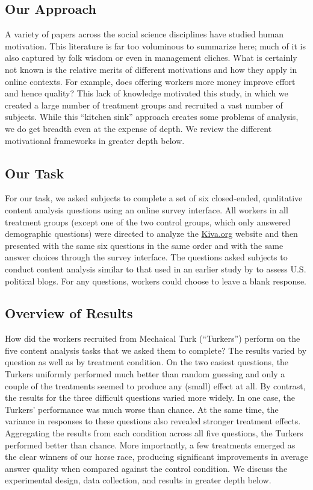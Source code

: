 \documentclass{chi2009}
\begin{document}
{\subsection{Our Approach} 
A variety of papers across the social science disciplines have studied
human motivation. This literature is far too voluminous to summarize
here; much of it is also captured by folk wisdom or even in management
cliches. What is certainly not known is the relative merits of
different motivations and how they apply in online contexts. For
example, does offering workers more money improve effort and hence
quality? This lack of knowledge motivated this study, in which we
created a large number of treatment groups and recruited a vast number
of subjects. While this ``kitchen sink'' approach creates some
problems of analysis, we do get breadth even at the expense of
depth. We review the different motivational frameworks in greater
depth below.

\subsection{Our Task} 
For our task, we asked subjects to complete a set of six closed-ended,
qualitative content analysis questions using an online survey
interface. All workers in all treatment groups (except one of the two
control groups, which only answered demographic questions) were
directed to analyze the \href{http://www.kiva.org}{Kiva.org} website and then presented with the same
six questions in the same order and with the same answer choices
through the survey interface. The questions asked subjects to conduct
content analysis similar to that used in an earlier study by
\cite{benklershaw2010} to assess U.S. political blogs. For any
questions, workers could choose to leave a blank response.


\subsection{Overview of Results} 
How did the workers recruited from Mechaical Turk (``Turkers'') 
perform on the five content analysis tasks that we
asked them to complete? The results varied by question as well as by
treatment condition. On the two easiest questions, the Turkers
uniformly performed much better than random guessing and only a couple
of the treatments seemed to produce any (small) effect at all. By
contrast, the results for the three difficult questions varied more
widely. In one case, the Turkers' performance was much worse than
chance. At the same time, the variance in responses to these questions
also revealed stronger treatment effects. Aggregating the results from
each condition across all five questions, the Turkers performed better
than chance. More importantly, a few treatments emerged as the clear
winners of our horse race, producing significant improvements in
average answer quality when compared against the control condition. We
discuss the experimental design, data collection, and results in
greater depth below.

}
\end{document}
